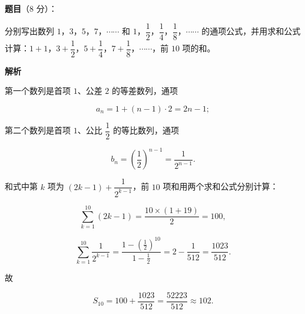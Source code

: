 \begin{answer}

\textbf{题目}（8 分）：

分别写出数列 $1$，$3$，$5$，$7$，$\cdots\cdots$ 和 $1$，$\dfrac12$，$\dfrac14$，$\dfrac18$，$\cdots\cdots$ 的通项公式，并用求和公式计算：$1+1$，$3+\dfrac12$，$5+\dfrac14$，$7+\dfrac18$，$\cdots\cdots$，前 $10$ 项的和。

\textbf{解析}

第一个数列是首项 $1$、公差 $2$ 的等差数列，通项

\nopagebreak[4]
\[
a_n=1+(n-1)\cdot 2=2n-1;
\]

第二个数列是首项 $1$、公比 $\dfrac12$ 的等比数列，通项

\nopagebreak[4]
\[
b_n=\left(\frac12\right)^{n-1}=\frac{1}{2^{n-1}}.
\]

和式中第 $k$ 项为 $\left(2k-1\right)+\dfrac{1}{2^{k-1}}$，前 $10$ 项和用两个求和公式分别计算：

\nopagebreak[4]
\[
\sum_{k=1}^{10}(2k-1)=\frac{10\times(1+19)}{2}=100,
\]

\nopagebreak[4]
\[
\sum_{k=1}^{10}\frac{1}{2^{k-1}}
=\frac{1-\left(\frac12\right)^{10}}{1-\frac12}
=2-\frac{1}{512}
=\frac{1023}{512}.
\]

故

\nopagebreak[4]
\[
S_{10}=100+\frac{1023}{512}=\frac{52223}{512}\approx 102.
\]


\end{answer}
